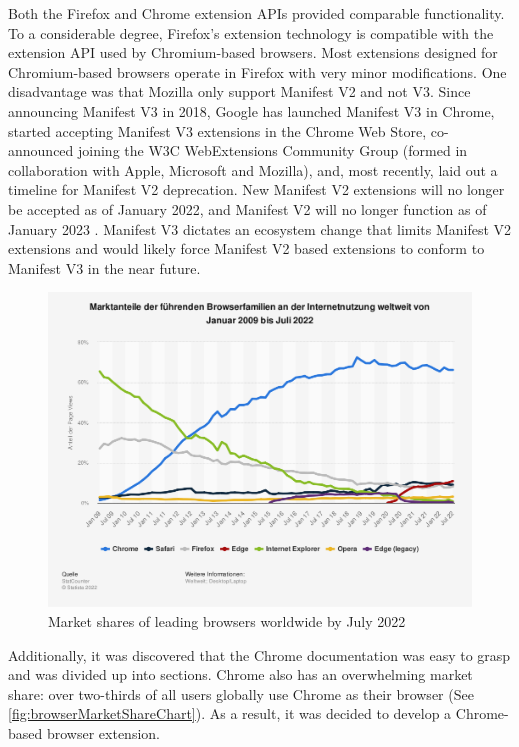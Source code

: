 Both the Firefox and Chrome extension APIs provided comparable functionality. To a considerable degree, Firefox's extension technology is compatible with the extension API used by Chromium-based browsers. Most extensions designed for Chromium-based browsers operate in Firefox with very minor modifications. One disadvantage was that Mozilla only support Manifest V2 and not V3. Since announcing Manifest V3 in 2018, Google has launched Manifest V3 in Chrome, started accepting Manifest V3 extensions in the Chrome Web Store, co-announced joining the W3C WebExtensions Community Group (formed in collaboration with Apple, Microsoft and Mozilla), and, most recently, laid out a timeline for Manifest V2 deprecation. New Manifest V2 extensions will no longer be accepted as of January 2022, and Manifest V2 will no longer function as of January 2023 \autocite{alexei2021manifest}. Manifest V3 dictates an ecosystem change that limits Manifest V2 extensions and would likely force Manifest V2 based extensions to conform to Manifest V3 in the near future.

\begin{figure}[ht!]
  \includegraphics[width=\textwidth]{assets/statistic_id157944_marktanteile-fuehrender-browser-weltweit-bis-juli-2022.png}
  \caption{Market shares of leading browsers worldwide by July 2022}
  \label{fig:browserMarketShareChart}
\end{figure}

Additionally, it was discovered that the Chrome documentation was easy to grasp and was divided up into sections. Chrome also has an overwhelming market share: over two-thirds of all users globally use Chrome as their browser (See \autoref{fig:browserMarketShareChart}). As a result, it was decided to develop a Chrome-based browser extension.

